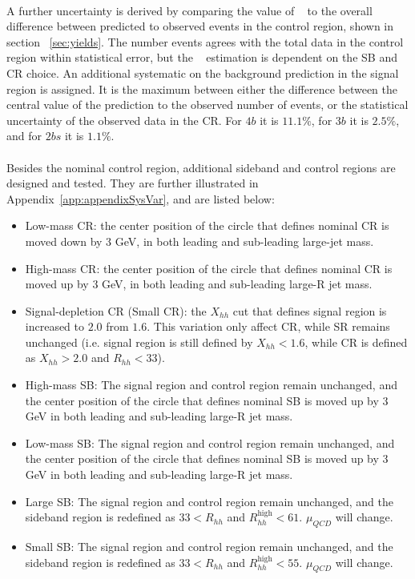 \paragraph{}
A further uncertainty is derived by comparing the value of \muqcd~ to the overall difference between predicted to observed events in the control region, shown in section ~\ref{sec:yields}. 
The number events agrees with the total data in the control region within statistical error, but the \muqcd~ estimation is dependent on the SB and CR choice.
An additional systematic on the background prediction in the signal region is assigned. 
It is the maximum between either the difference between the central value of the prediction to the observed number of events, or the statistical uncertainty of the observed data in the CR.
For $4b$ it is $11.1\%$, for $3b$ it is $2.5\%$, and for $2bs$ it is $1.1\%$. 

\paragraph{}
Besides the nominal control region, additional sideband and control regions are designed and tested. 
They are further illustrated in Appendix~\ref{app:appendixSysVar}, and are listed below:
\begin{itemize}
	\item Low-mass CR: the center position of the circle that defines nominal CR is moved down by 3 GeV, in both leading and sub-leading large-jet mass.
	\item High-mass CR: the center position of the circle that defines nominal CR is moved up by 3 GeV, in both leading and sub-leading large-R jet mass.
	\item Signal-depletion CR (Small CR): the $X_{hh}$ cut that defines signal region is increased to $2.0$ from $1.6$. This variation only affect CR, while SR remains unchanged (i.e. signal region is still defined by $X_{hh}<1.6$, while CR is defined as $X_{hh}>2.0$ and $R_{hh}<33$).
	\item High-mass SB: The signal region and control region remain unchanged, and the center position of the circle that defines nominal SB is moved up by 3 GeV in both leading and sub-leading large-R jet mass.
	\item Low-mass SB: The signal region and control region remain unchanged, and the center position of the circle that defines nominal SB is moved up by 3 GeV in both leading and sub-leading large-R jet mass.
	\item Large SB: The signal region and control region remain unchanged, and the sideband region is redefined as $33 < R_{hh}$ and $ R_{hh}^{\text{high}} < 61$. $\mu_{QCD}$ will change.
	\item Small SB: The signal region and control region remain unchanged, and the sideband region is redefined as $33 < R_{hh}$ and $ R_{hh}^{\text{high}} < 55$. $\mu_{QCD}$ will change.
\end{itemize}

